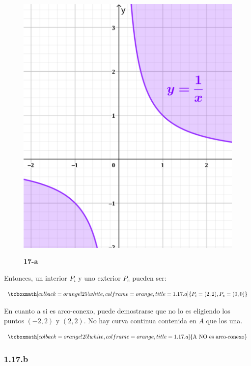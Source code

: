 \documentclass{article}
\begin{document}
\begin{figure}[ht]
\caption{\textbf{17-a}}
\includegraphics[scale=1]{img/ejercicios/1/11-g.png} 
\centering
\label{fig:1-17-a}
\end{figure}

Entonces, un interior $P_i$ y uno exterior $P_e$ pueden ser:

\begin{equation}
\tcboxmath[colback=orange!25!white,colframe=orange,title=1.17.a]
{
P_i = (2,2), P_e = (0, 0)
}
\end{equation}

En cuanto a si es arco-conexo, puede demostrarse que no lo es eligiendo los puntos $(-2,2)$ y $(2,2)$. No hay curva continua contenida en $A$ que los una.

\begin{equation}
\tcboxmath[colback=orange!25!white,colframe=orange,title=1.17.a]
{ \text{A NO es arco-conexo} }
\end{equation}

\subsubsection*{1.17.b}
\label{subsubsec:1.17.b}
\end{document}
